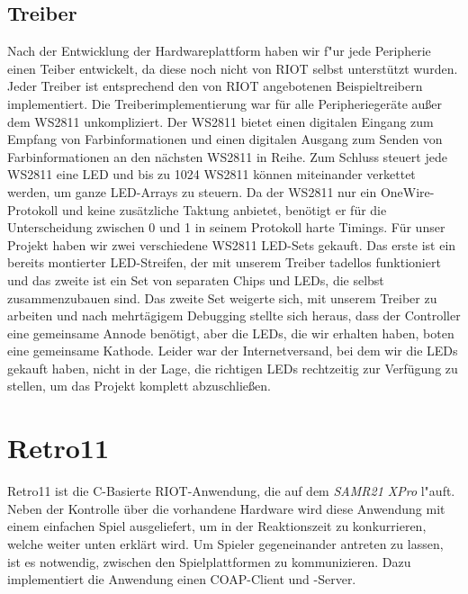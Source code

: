 \documentclass[a4paper]{article}
\begin{document}
  \subsection{Treiber}
    \label{sec:hardware_driver}
    Nach der Entwicklung der Hardwareplattform haben wir f"ur jede Peripherie
    einen Teiber entwickelt, da diese noch nicht von RIOT selbst unterstützt
    wurden. Jeder Treiber ist entsprechend den von RIOT angebotenen
    Beispieltreibern implementiert. Die Treiberimplementierung war für alle
    Peripheriegeräte außer dem WS2811 unkompliziert. Der WS2811 bietet einen
    digitalen Eingang zum Empfang von Farbinformationen und einen digitalen
    Ausgang zum Senden von Farbinformationen an den nächsten WS2811 in Reihe.
    Zum Schluss steuert jede WS2811 eine LED und bis zu 1024 WS2811 können
    miteinander verkettet werden, um ganze LED-Arrays zu steuern. Da der WS2811
    nur ein OneWire-Protokoll und keine zusätzliche Taktung anbietet, benötigt
    er für die Unterscheidung zwischen 0 und 1 in seinem Protokoll harte
    Timings. Für unser Projekt haben wir zwei verschiedene WS2811 LED-Sets
    gekauft. Das erste ist ein bereits montierter LED-Streifen, der mit unserem
    Treiber tadellos funktioniert und das zweite ist ein Set von separaten
    Chips und LEDs, die selbst zusammenzubauen sind. Das zweite Set weigerte
    sich, mit unserem Treiber zu arbeiten und nach mehrtägigem Debugging
    stellte sich heraus, dass der Controller eine gemeinsame Annode benötigt,
    aber die LEDs, die wir erhalten haben, boten eine gemeinsame Kathode.
    Leider war der Internetversand, bei dem wir die LEDs gekauft haben, nicht
    in der Lage, die richtigen LEDs rechtzeitig zur Verfügung
    zu stellen, um das Projekt komplett abzuschließen.

\section{Retro11}
  \label{sec:retro11}
  Retro11 ist die C-Basierte RIOT-Anwendung, die auf dem \textit{SAMR21 XPro}
  l"auft. Neben der Kontrolle über die vorhandene Hardware wird diese
  Anwendung mit einem einfachen Spiel ausgeliefert, um in der Reaktionszeit zu
  konkurrieren, welche weiter unten erklärt wird. Um Spieler gegeneinander
  antreten zu lassen, ist es notwendig, zwischen den Spielplattformen zu
  kommunizieren. Dazu implementiert die Anwendung einen COAP-Client und
  -Server.\\
\end{document}
